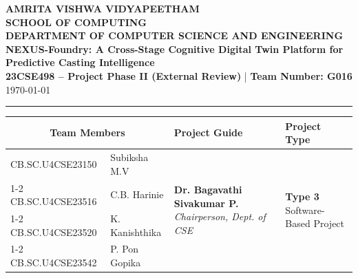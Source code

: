 \documentclass[11pt, a4paper]{article}
\begin{document}
\noindent
\begin{minipage}{\textwidth}
    \centering
    {\Large \textbf{\textcolor{amritaMaroon}{
    AMRITA VISHWA VIDYAPEETHAM \\
    SCHOOL OF COMPUTING \\
    DEPARTMENT OF COMPUTER SCIENCE AND ENGINEERING \\
    }}}
    \vspace{0.2cm}
    {\large \textbf{NEXUS-Foundry: A Cross-Stage Cognitive Digital Twin Platform for Predictive Casting Intelligence}} \\[0.1cm]
    \textbf{23CSE498 -- Project Phase II (External Review)} \quad | \quad \textbf{Team Number: G016} \\
    \today
\end{minipage}

\vspace{0.3cm}
\hrule
\vspace{0.3cm}

\noindent
\begin{center}
    \renewcommand{\arraystretch}{1.45}
    \setlength{\tabcolsep}{6pt}
    \begin{tabular}{|l|p{4.8cm}|p{4.6cm}|p{3.2cm}|}
        \hline
        \multicolumn{2}{|c|}{\textbf{Team Members}} & \textbf{Project Guide} & \textbf{Project Type} \\
        \hline
        \small CB.SC.U4CSE23150 & \small \raggedright Subiksha M.V &
        \multirow{4}{=}{\raggedright \small \textbf{Dr. Bagavathi Sivakumar P.} \newline \textit{Chairperson, \newline Dept. of CSE}} &
        \multirow{4}{=}{\raggedright \small \textbf{Type 3} \newline Software-Based Project} \\ \cline{1-2}
        \small CB.SC.U4CSE23516 & \small C.B. Harinie & & \\ \cline{1-2}
        \small CB.SC.U4CSE23520 & \small K. Kanishthika & & \\ \cline{1-2}
        \small CB.SC.U4CSE23542 & \small P. Pon Gopika & & \\
        \hline
    \end{tabular}
\end{center}
\vspace{0.2cm}
\end{document}
